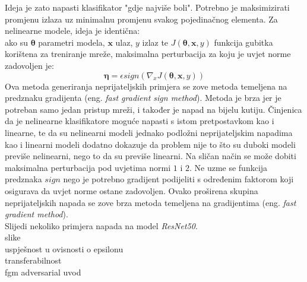 \documentclass[utf8, diplomski]{fer}
\begin{document}
\par
Ideja je zato napasti klasifikator "gdje najviše boli". Potrebno je maksimizirati promjenu izlaza uz minimalnu promjenu svakog pojedinačnog elementa. Za nelinearne modele, ideja je identična: \\
ako su $\boldsymbol{\theta}$ parametri modela, $\boldsymbol{x}$ ulaz, $y$ izlaz te $J(\boldsymbol{\theta}, \boldsymbol{x}, y)$ funkcija gubitka korištena za treniranje mreže, maksimalna perturbacija za koju je uvjet norme zadovoljen je:
\begin{equation}
	\boldsymbol{\eta} = \epsilon sign(\nabla_{x}J(\boldsymbol{\theta}, \boldsymbol{x}, y))
\end{equation}
Ova metoda generiranja neprijateljskih primjera se zove metoda temeljena na predznaku gradijenta (eng. \textit{fast gradient sign method}). Metoda je brza jer je potreban samo jedan pristup mreži, i također je napad na bijelu kutiju.
Činjenica da je nelinearne klasifikatore moguće napasti s istom pretpostavkom kao i linearne, te da su nelinearni modeli jednako podložni neprijateljskim napadima kao i linearni modeli dodatno dokazuje da problem nije to što su duboki modeli previše nelinearni, nego to da su previše linearni. Na sličan način se može dobiti maksimalna perturbacija pod uvjetima normi $1$ i $2$. Ne uzme se funkcija predznaka $sign$ nego je potrebno gradijent podijeliti s određenim faktorom koji osigurava da uvjet norme ostane zadovoljen. Ovako proširena skupina neprijateljskih napada se zove brza metoda temeljena na gradijentima (eng. \textit{fast gradient method}). \\
Slijedi nekoliko primjera napada na model \textit{ResNet50}. \\
slike \\
uspješnost u ovisnosti o epsilonu \\
transferabilnost \\
fgm adversarial uvod 
\end{document}
